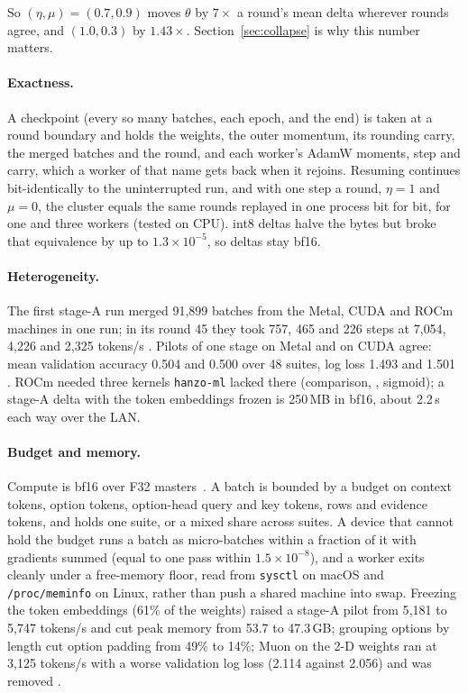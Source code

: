 So $(\eta, \mu) = (0.7, 0.9)$ moves $\theta$ by $7\times$ a round's mean delta
wherever rounds agree, and $(1.0, 0.3)$ by $1.43\times$. Section~\ref{sec:collapse}
is why this number matters.

\paragraph{Exactness.}
A checkpoint (every so many batches, each epoch, and the end) is taken at a
round boundary and holds the weights, the outer momentum, its rounding carry,
the merged batches and the round, and each worker's AdamW moments, step and
carry, which a worker of that name gets back when it rejoins. Resuming continues
bit-identically to the uninterrupted run, and with one step a round, $\eta = 1$
and $\mu = 0$, the cluster equals the same rounds replayed in one process bit
for bit, for one and three workers (tested on CPU). int8 deltas halve the bytes
but broke that equivalence by up to $1.3\times10^{-5}$, so deltas stay bf16.

\paragraph{Heterogeneity.}
The first stage-A run merged 91{,}899 batches from the Metal, CUDA and ROCm
machines in one run; in its round 45 they took 757, 465 and 226 steps at
7{,}054, 4{,}226 and 2{,}325 tokens/s \meas. Pilots of one stage on Metal and on
CUDA agree: mean validation accuracy 0.504 and 0.500 over 48 suites, log loss
1.493 and 1.501 \meas. ROCm needed three kernels \texttt{hanzo-ml} lacked there
(comparison, , sigmoid); a stage-A delta with the token
embeddings frozen is 250\,MB in bf16, about 2.2\,s each way over the LAN.

\paragraph{Budget and memory.}
Compute is bf16 over F32 masters~\cite{micikevicius2018mixed}. A batch is bounded
by a budget on context tokens, option tokens, option-head query and key tokens,
rows and evidence tokens, and holds one suite, or a mixed share across suites.
A device that cannot hold the budget runs a batch as micro-batches within a
fraction of it with gradients summed (equal to one pass within
$1.5\times10^{-8}$), and a worker exits cleanly under a free-memory floor, read
from \texttt{sysctl} on macOS and \texttt{/proc/meminfo} on Linux, rather than
push a shared machine into swap. Freezing the token embeddings (61\% of the
weights) raised a stage-A pilot from 5{,}181 to 5{,}747 tokens/s and cut peak
memory from 53.7 to 47.3\,GB; grouping options by length cut option padding from
49\% to 14\%; Muon on the 2-D weights ran at 3{,}125 tokens/s with a worse
validation log loss (2.114 against 2.056) and was removed \meas.

